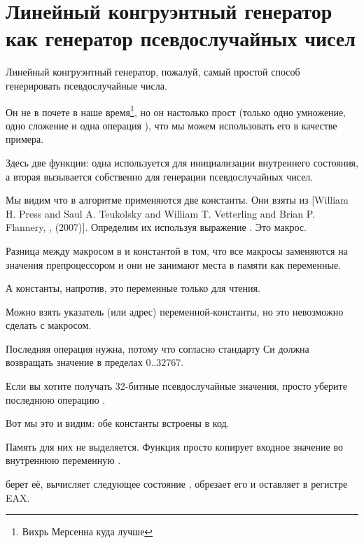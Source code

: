 \chapter[Линейный конгруэнтный генератор]{Линейный конгруэнтный генератор как генератор псевдослучайных чисел}
\label{LCG_simple}

Линейный конгруэнтный генератор, пожалуй, самый простой способ генерировать псевдослучайные числа.

Он не в почете в наше время\footnote{Вихрь Мерсенна куда лучше}, но он настолько прост
(только одно умножение, одно сложение и одна операция ),
что мы можем использовать его в качестве примера.



Здесь две функции: одна используется для инициализации внутреннего состояния, а вторая
вызывается собственно для генерации псевдослучайных чисел.

Мы видим что в алгоритме применяются две константы.
Они взяты из
[William H. Press and Saul A. Teukolsky and William T. Vetterling and Brian P. Flannery, , (2007)].
Определим их используя выражение \CCpp {}. Это макрос.

Разница между макросом в \CCpp и константой в том, что все макросы заменяются на значения препроцессором
\CCpp и они не занимают места в памяти как переменные.

А константы, напротив, это переменные только для чтения.

Можно взять указатель (или адрес) переменной-константы, но это невозможно сделать с макросом.

Последняя операция  нужна, потому что согласно стандарту Си  должна возвращать значение в пределах
0..32767.

Если вы хотите получать 32-битные псевдослучайные значения, просто уберите последнюю операцию .




Вот мы это и видим: обе константы встроены в код.

Память для них не выделяется.
Функция  просто копирует входное значение во внутреннюю переменную .

 берет её, вычисляет следующее состояние , 
обрезает его и оставляет в регистре EAX.

